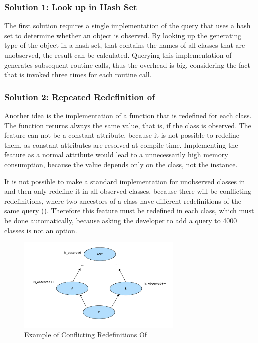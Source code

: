 \subsubsection{Solution 1: Look up in Hash Set}
The first solution requires a single implementation of the query  that uses a hash set to determine whether an object is observed. By looking up the generating type of the object in a hash set, that contains the names of all classes that are unobserved, the result can be calculated. Querying this implementation of  generates subsequent routine calls, thus the overhead is big, considering the fact that  is invoked three times for each routine call.

\subsubsection{Solution 2: Repeated Redefinition of }
Another idea is the implementation of a function that is redefined for each class. The function returns always the same value, that is, if the class is observed. The feature can not be a constant attribute, because it is not possible to redefine them, as constant attributes  are resolved at compile time. Implementing the feature as a normal attribute would lead to a unnecessarily high memory consumption, because the value depends only on the class, not the instance.

It is not possible to make a standard implementation for unobserved classes in  and then only redefine it in all observed classes, because there will be conflicting redefinitions, where two ancestors of a class have different redefinitions of the same query \cite{oosc2} (). Therefore this feature must be redefined in each class, which must be done automatically, because asking the developer to add a query to 4000 classes is not an option.
\begin{figure}[ht]
  \centering
  \includegraphics[width=0.7\textwidth]{illustrations/observed_query_conflicting_redefinitions}
  \caption{Example of Conflicting Redefinitions Of }
  \label{fig:observed_query_conflicting_redefinitions}
\end{figure}

